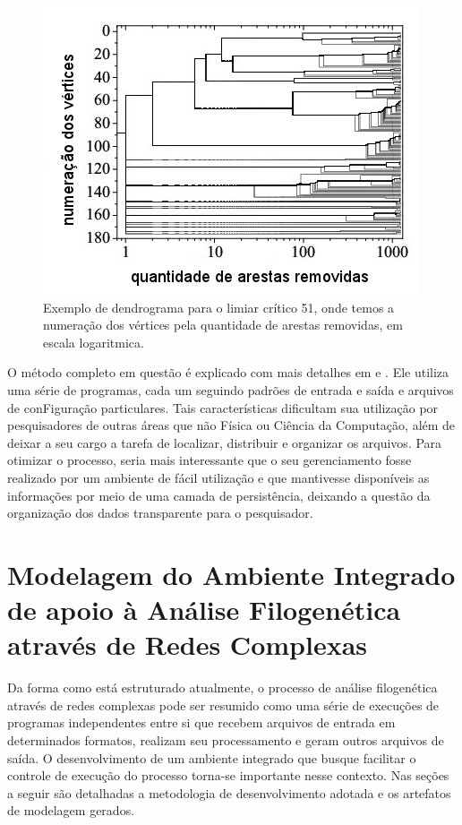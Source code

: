 \begin{figure}
\centering
\includegraphics[scale=0.73]{dendrograma}
\caption{Exemplo de dendrograma para o limiar crítico 51, onde temos a numeração dos vértices pela quantidade de arestas removidas, em escala logaritmica.}
\label{fig:dendrograma}
\end{figure}

O método completo em questão é explicado com mais detalhes em \cite{goesneto2010} e \cite{andrade2011}. Ele utiliza uma série de programas, cada um
seguindo padrões de entrada e saída e arquivos de conFiguração particulares. Tais características dificultam sua utilização por pesquisadores de outras
áreas que não Física ou Ciência da Computação, além de deixar a seu cargo a tarefa de localizar, distribuir e organizar os arquivos. Para otimizar
o processo, seria mais interessante que o seu gerenciamento fosse realizado por um ambiente de fácil utilização e que
mantivesse disponíveis as informações por meio de uma camada de persistência, deixando a questão da organização dos dados transparente para o
pesquisador.

\chapter{Modelagem do Ambiente Integrado de apoio à Análise Filogenética através de Redes Complexas}
\label{cap:navi}

Da forma como está estruturado atualmente, o processo de análise filogenética através de redes complexas pode ser resumido como uma série de execuções
de programas independentes entre si que recebem arquivos
de entrada em determinados formatos, realizam seu
processamento e geram outros arquivos de saída. O desenvolvimento de um ambiente integrado que busque facilitar o controle de execução do processo
torna-se importante nesse contexto. Nas seções a seguir são detalhadas a metodologia de desenvolvimento adotada e
os artefatos de modelagem gerados.

